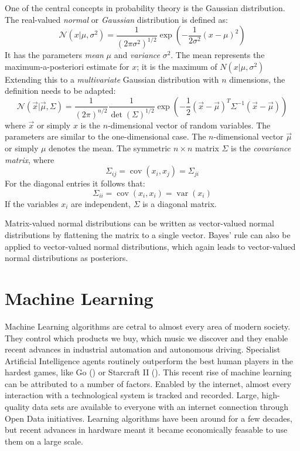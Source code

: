 \documentclass[twoside,12pt,a4paper]{report}
\newcommand{\cov}{\operatorname{cov}}
\newcommand{\var}{\operatorname{var}}
\begin{document}
One of the central concepts in probability theory is the Gaussian distribution.
The real-valued \textit{normal} or \textit{Gaussian} distribution is defined as:
$$\mathcal{N}(x | \mu, \sigma^2) = \frac{1}{(2\pi \sigma^2)^{1/2}} \exp\left(- \frac{1}{2\sigma^2} (x-\mu)^2 \right)$$
It has the parameters \textit{mean} $\mu$ and \textit{variance} $\sigma ^2$.
The mean represents the maximum-a-posteriori estimate for $x$; it is the maximum of $N(x | \mu, \sigma^2)$
Extending this to a \textit{multivariate} Gaussian distribution with $n$ dimensions, the definition needs to be adapted:
$$\mathcal{N}(\vec{x} | \vec{\mu}, \Sigma) = \frac{1}{(2\pi)^{n/2}} \frac{1}{\det(\Sigma)^{1/2}} \exp\left(-\frac{1}{2} (\vec{x} - \vec{\mu})^T \Sigma ^{-1} (\vec{x} - \vec{\mu})\right)$$
where $\vec{x}$ or simply $x$ is the $n$-dimensional vector of random variables. The parameters are similar to the one-dimensional case. The $n$-dimensional vector $\vec{\mu}$ or simply $\mu$ denotes the mean. The symmetric $n \times n$ matrix $\Sigma$ is the \textit{covariance matrix}, where
$$ \Sigma_{ij} =  \cov(x_i, x_j) = \Sigma_{ji}$$
For the diagonal entries it follows that:
$$\Sigma_{ii} = \cov(x_i,x_i) = \var(x_i)$$
If the variables $x_i$ are independent, $\Sigma$ is a diagonal matrix.

Matrix-valued normal distributions can be written as vector-valued normal distributions by flattening the matrix to a single vector.
Bayes' rule can also be applied to vector-valued normal distributions, which again leads to vector-valued normal distributions as posteriors.

\section{Machine Learning}
Machine Learning algorithms are cetral to almost every area of modern society. They control which products we buy, which music we discover and they enable recent advances in industrial automation and autonomous driving. Specialist Artificial Intelligence agents routinely outperform the best human players in the hardest games, like Go (\cite{gibney2016google}) or Starcraft II (\cite{vinyals2019alphastar}).
This recent rise of machine learning can be attributed to a number of factors. Enabled by the internet, almost every interaction with a technological system is tracked and recorded. Large, high-quality data sets are available to everyone with an internet connection through Open Data initiatives.
Learning algorithms have been around for a few decades, but recent advances in hardware meant it became economically feasable to use them on a large scale.
\end{document}
